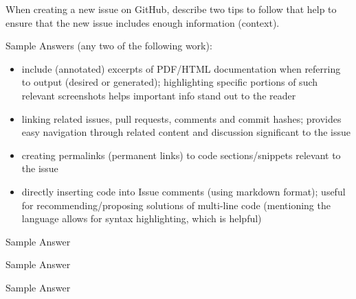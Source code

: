 \documentclass[12pt,fleqn]{examtst}
\begin{document}

\newpage
\noindent
\begin{minipage}{\textwidth}

When creating a new issue on GitHub, describe two tips to follow that help to ensure that the new issue includes enough information (context).


Sample Answers (any two of the following work):
\begin{itemize}
    \item include (annotated) excerpts of PDF/HTML documentation when referring to output (desired or generated); highlighting specific portions of such relevant screenshots helps important info stand out to the reader
    \item linking related issues, pull requests, comments and commit hashes; provides easy navigation through related content and discussion significant to the issue
    \item creating permalinks (permanent links) to code sections/snippets relevant to the issue
    \item directly inserting code into Issue comments (using markdown format); useful for recommending/proposing solutions of multi-line code (mentioning the language allows for syntax highlighting, which is helpful)
\end{itemize}




Sample Answer

\end{minipage}


\newpage
\noindent
\begin{minipage}{\textwidth}




Sample Answer




Sample Answer

\end{minipage}
\end{document}
